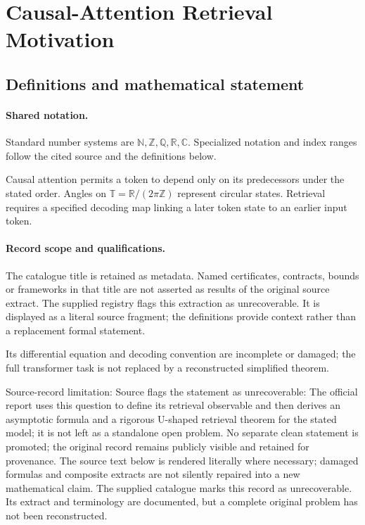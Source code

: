 \documentclass[11pt]{article}
\begin{document}
\section{Causal-Attention Retrieval Motivation}\label{statement}

\subsection{Definitions and mathematical statement}

\paragraph{Shared notation.}Standard number systems are $\mathbb N,\mathbb Z,\mathbb Q,\mathbb R,\mathbb C$. Specialized notation and index ranges follow the cited source and the definitions below.


Causal attention permits a token to depend only on its predecessors under the stated order. Angles on $\mathbb T=\mathbb R/(2\pi\mathbb Z)$ represent circular states. Retrieval requires a specified decoding map linking a later token state to an earlier input token.
\paragraph{Record scope and qualifications.}
The catalogue title is retained as metadata. Named certificates, contracts, bounds or frameworks in that title are not asserted as results of the original source extract.
The supplied registry flags this extraction as unrecoverable. It is displayed as a literal source fragment; the definitions provide context rather than a replacement formal statement.

Its differential equation and decoding convention are incomplete or damaged; the full transformer task is not replaced by a reconstructed simplified theorem.

Source-record limitation: Source flags the statement as unrecoverable: The official report uses this question to define its retrieval observable and then derives an asymptotic formula and a rigorous U-shaped retrieval theorem for the stated model; it is not left as a standalone open problem. No separate clean statement is promoted; the original record remains publicly visible and retained for provenance.
The source text below is rendered literally where necessary; damaged formulas and composite extracts are not silently repaired into a new mathematical claim.
The supplied catalogue marks this record as unrecoverable. Its extract and terminology are documented, but a complete original problem has not been reconstructed.
\end{document}
